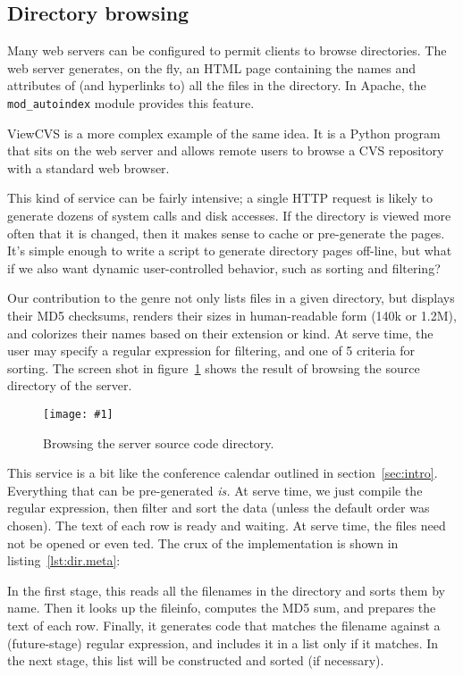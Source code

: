 \documentclass[preprint]{acm_proc_article-sp}
\newcommand{\myfig}[3]{%
  \begin{figure}[tbp]%
    #3%
    \caption{#2}%
    \label{fig:#1}%
  \end{figure}}
\newcommand{\screenshot}[2]{%
  \myfig{#1}{#2}
  {\centering%
    \texttt{[image: \#1]}}}
\newcounter{listing}
\newcommand{\mylst}[2]{%
  \captionof{listing}{\textbf{#1.} #2}%
  \label{lst:#1}%
  \lgrindfile{#1}}
\begin{document}
\subsection{Directory browsing}
\label{sec:eg:browse}

Many web servers can be configured to permit clients to browse
directories.  The web server generates, on the fly, an HTML page
containing the names and attributes of (and hyperlinks to) all
the files in the directory.  In Apache, the
\texttt{mod\_autoindex} module provides this feature.

ViewCVS is a more complex example of the same idea.  It is a
Python program that sits on the web server and allows remote
users to browse a CVS repository with a standard web browser.

This kind of service can be fairly intensive; a single HTTP
request is likely to generate dozens of system calls and disk
accesses.  If the directory is viewed more often that it is
changed, then it makes sense to cache or pre-generate the pages.
It's simple enough to write a script to generate directory pages
off-line, but what if we also want dynamic user-controlled
behavior, such as sorting and filtering?

Our contribution to the genre not only lists files in a given
directory, but displays their MD5 checksums, renders their sizes
in human-readable form (140k or 1.2M), and colorizes their names
based on their extension or kind.  At serve time, the user may
specify a regular expression for filtering, and one of 5
criteria for sorting.  The screen shot in
figure~\ref{fig:server-dir} shows the result of browsing the
source directory of the server.

\screenshot{server-dir}{Browsing the server source code directory.}

This service is a bit like the conference calendar outlined in
section~\ref{sec:intro}.  Everything that can be pre-generated
\emph{is.}  At serve time, we just compile the regular expression,
then filter and sort the data (unless the default order was chosen).
The text of each row is ready and waiting.  At serve time, the files
need not be opened or even ted.  The crux of the
implementation is shown in listing~\ref{lst:dir.meta}:

\mylst{dir.meta}{...}

In the first stage, this reads
all the filenames in the directory and sorts them by name.  Then
it looks up the fileinfo, computes the MD5 sum, and prepares the
text of each row.  Finally, it generates code that matches the
filename against a (future-stage) regular expression, and
includes it in a list only if it matches.  In the next stage,
this list will be constructed and sorted (if necessary).  
\end{document}
